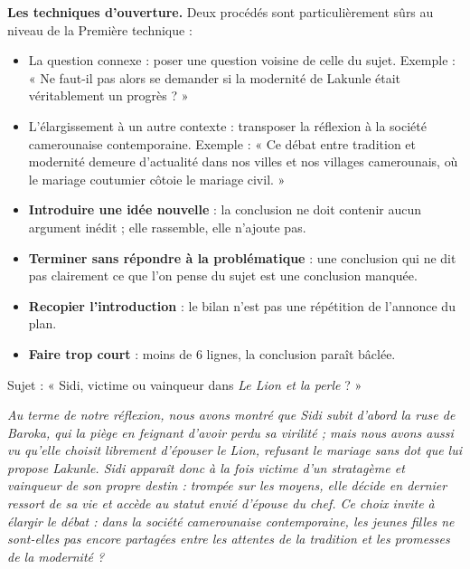\documentclass[11pt]{article}
\newcommand{\cle}[1]{{\popxbold\color{popdark}#1}}
\begin{document}
\textbf{Les techniques d'ouverture.} Deux procédés sont particulièrement sûrs au niveau de la Première technique :
\begin{itemize}
\item La \cle{question connexe} : poser une question voisine de celle du sujet. Exemple : « Ne faut-il pas alors se demander si la modernité de Lakunle était véritablement un progrès ? »
\item L'\cle{élargissement à un autre contexte} : transposer la réflexion à la société camerounaise contemporaine. Exemple : « Ce débat entre tradition et modernité demeure d'actualité dans nos villes et nos villages camerounais, où le mariage coutumier côtoie le mariage civil. »
\end{itemize}

\begin{attention}
\begin{itemize}
\item \textbf{Introduire une idée nouvelle} : la conclusion ne doit contenir aucun argument inédit ; elle rassemble, elle n'ajoute pas.
\item \textbf{Terminer sans répondre à la problématique} : une conclusion qui ne dit pas clairement ce que l'on pense du sujet est une conclusion manquée.
\item \textbf{Recopier l'introduction} : le bilan n'est pas une répétition de l'annonce du plan.
\item \textbf{Faire trop court} : moins de 6 lignes, la conclusion paraît bâclée.
\end{itemize}
\end{attention}

\begin{exemplebox}
Sujet : « Sidi, victime ou vainqueur dans \emph{Le Lion et la perle} ? »\par
\emph{Au terme de notre réflexion, nous avons montré que Sidi subit d'abord la ruse de Baroka, qui la piège en feignant d'avoir perdu sa virilité ; mais nous avons aussi vu qu'elle choisit librement d'épouser le Lion, refusant le mariage sans dot que lui propose Lakunle. Sidi apparaît donc à la fois victime d'un stratagème et vainqueur de son propre destin : trompée sur les moyens, elle décide en dernier ressort de sa vie et accède au statut envié d'épouse du chef. Ce choix invite à élargir le débat : dans la société camerounaise contemporaine, les jeunes filles ne sont-elles pas encore partagées entre les attentes de la tradition et les promesses de la modernité ?}
\end{exemplebox}
\end{document}
